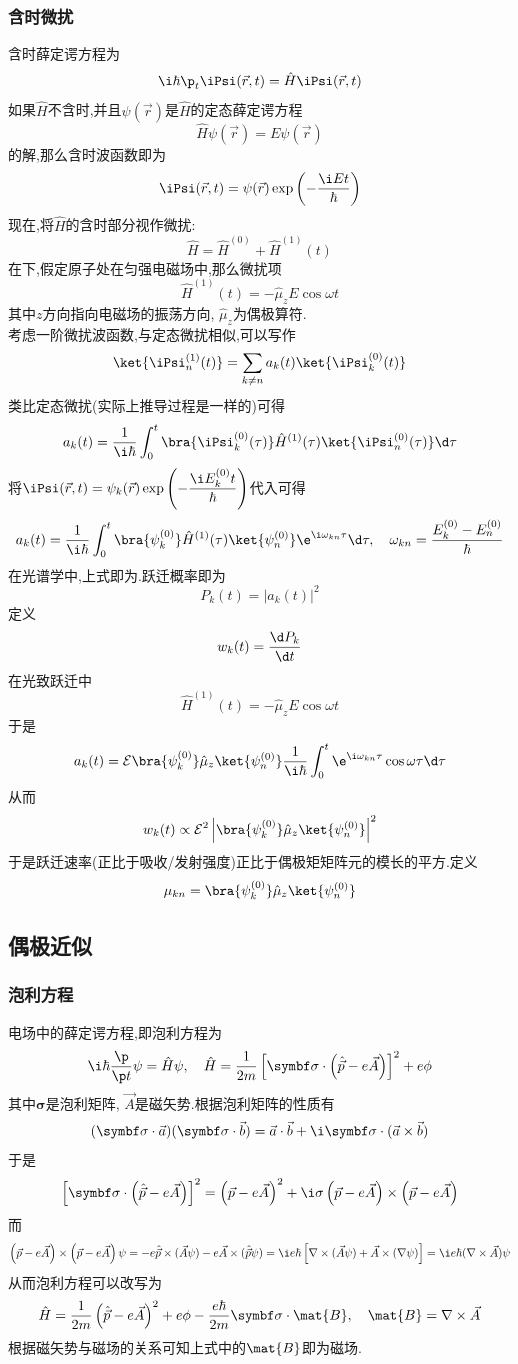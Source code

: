 \documentclass{ctexbook}
\begin{document}
\subsubsection{含时微扰}
含时薛定谔方程为
\[\i\hbar\p_t\iPsi(\vec{r},t)=\hat{H}\iPsi(\vec{r},t)\]
如果$\hat{H}$不含时,并且$\psi(\vec{r})$是$\hat{H}$的定态薛定谔方程
\[\hat{H}\psi(\vec{r})=E\psi(\vec{r})\]
的解,那么含时波函数即为
\[\iPsi(\vec{r},t)=\psi(\vec{r})\exp\left(-\dfrac{\i Et}{\hbar}\right)\]
\indent 现在,将$\hat{H}$的含时部分视作微扰:
\[\hat{H}=\hat{H}^{(0)}+\hat{H}^{(1)}(t)\]
在下,假定原子处在匀强电磁场中,那么微扰项
\[\hat{H}^{(1)}(t)=-\hat{\mu}_zE\cos\omega t\]
其中$z$方向指向电磁场的振荡方向, $\hat{\mu}_z$为偶极算符.\\
\indent 考虑一阶微扰波函数,与定态微扰相似,可以写作
\[\ket{\iPsi_n^{(1)}(t)}=\sum_{k\neq n}a_k(t)\ket{\iPsi^{(0)}_k(t)}\]
类比定态微扰(实际上推导过程是一样的)可得
\[a_k(t)=\dfrac{1}{\i\hbar}\int_0^{t}\bra{\iPsi_k^{(0)}(\tau)}\hat{H}^{(1)}(\tau)\ket{\iPsi_n^{(0)}(\tau)}\d\tau\]
将$\iPsi(\vec{r},t)=\psi_k(\vec{r})\exp\left(-\dfrac{\i E_k^{(0)}t}{\hbar}\right)$代入可得
\[a_k(t)=\dfrac{1}{\i\hbar}\int_0^{t}\bra{\psi_k^{(0)}}\hat{H}^{(1)}(\tau)\ket{\psi_n^{(0)}}\e^{\i\omega_{kn}\tau}\d\tau,\quad\omega_{kn}=\dfrac{E_k^{(0)}-E_n^{(0)}}{\hbar}\]
\indent 在光谱学中,上式即为.跃迁概率即为
\[P_k(t)=\left|a_k(t)\right|^2\]
定义
\[w_k(t)=\dfrac{\d P_k}{\d t}\]
在光致跃迁中
\[\hat{H}^{(1)}(t)=-\hat{\mu}_zE\cos\omega t\]
于是
\[a_k(t)=\mathcal{E}\bra{\psi_k^{(0)}}\hat{\mu}_z\ket{\psi_n^{(0)}}\dfrac{1}{\i\hbar}\int_0^{t}\e^{\i\omega_{kn}\tau}\cos\omega\tau\d\tau\]
从而
\[w_k(t)\propto\mathcal{E}^2\left|\bra{\psi_k^{(0)}}\hat{\mu}_z\ket{\psi_n^{(0)}}\right|^2\]
于是跃迁速率(正比于吸收/发射强度)正比于偶极矩矩阵元的模长的平方.定义
\[\mu_{kn}=\bra{\psi_k^{(0)}}\hat{\mu}_z\ket{\psi_n^{(0)}}\]
\subsection{偶极近似}
\subsubsection{泡利方程}
电场中的薛定谔方程,即泡利方程为
\[\i\hbar\dfrac{\p}{\p t}\psi=\hat{H}\psi,\quad\hat{H}=\dfrac{1}{2m}\left[\symbf\sigma\cdot\left(\hat{\vec{p}}-e\vec{A}\right)\right]^2+e\phi\]
其中$\symbf\sigma$是泡利矩阵, $\vec{A}$是磁矢势.根据泡利矩阵的性质有
\[(\symbf\sigma\cdot\vec{a})(\symbf\sigma\cdot\vec{b})=\vec{a}\cdot\vec{b}+\i\symbf\sigma\cdot(\vec{a}\times\vec{b})\]
于是
\[\left[\symbf\sigma\cdot\left(\hat{\vec{p}}-e\vec{A}\right)\right]^2=\left(\vec{p}-e\vec{A}\right)^2+\i\sigma\left(\vec{p}-e\vec{A}\right)\times\left(\vec{p}-e\vec{A}\right)\]
而
\[\left(\vec{p}-e\vec{A}\right)\times\left(\vec{p}-e\vec{A}\right)\psi=-e\hat{\vec{p}}\times(\vec{A}\psi)-e\vec{A}\times(\hat{\vec{p}}\psi)=\i e\hbar\left[\nabla\times(\vec{A}\psi)+\vec{A}\times(\nabla\psi)\right]=\i e\hbar(\nabla\times\vec{A})\psi\]
从而泡利方程可以改写为
\[\hat{H}=\dfrac{1}{2m}\left(\hat{\vec{p}}-e\vec{A}\right)^2+e\phi-\dfrac{e\hbar}{2m}\symbf\sigma\cdot\mat{B},\quad\mat{B}=\nabla\times\vec{A}\]
根据磁矢势与磁场的关系可知上式中的$\mat{B}$即为磁场.
\end{document}
